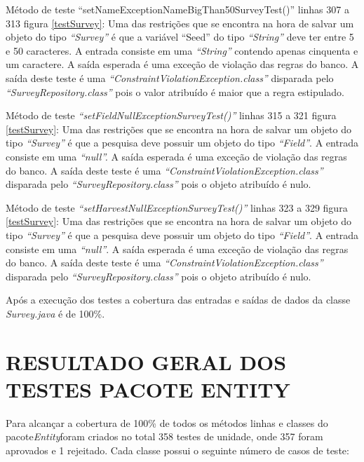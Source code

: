 Método de teste “setNameExceptionNameBigThan50SurveyTest()” linhas 307 a 313 figura \ref{testSurvey}: Uma das restrições que se encontra na hora de salvar um objeto do tipo \textit{“Survey”} é que a variável “Seed” do tipo \textit{“String”} deve ter entre 5 e 50 caracteres. A entrada consiste em uma \textit{“String”} contendo apenas cinquenta e um caractere. A saída esperada é uma exceção de violação das regras do banco. A saída deste teste é uma \textit{“ConstraintViolationException.class”} disparada pelo \textit{“SurveyRepository.class” }pois o valor atribuído é maior que a regra estipulado.

Método de teste \textit{“setFieldNullExceptionSurveyTest()”} linhas 315 a 321 figura \ref{testSurvey}: Uma das restrições que se encontra na hora de salvar um objeto do tipo \textit{“Survey”} é que a pesquisa deve possuir um objeto do tipo \textit{“Field”}. A entrada consiste em uma \textit{“null”.} A saída esperada é uma exceção de violação das regras do banco. A saída deste teste é uma \textit{“ConstraintViolationException.class”} disparada pelo \textit{“SurveyRepository.class”} pois o objeto atribuído é nulo.

Método de teste \textit{“setHarvestNullExceptionSurveyTest()”} linhas 323 a 329 figura \ref{testSurvey}: Uma das restrições que se encontra na hora de salvar um objeto do tipo \textit{“Survey”} é que a pesquisa deve possuir um objeto do tipo \textit{“Field”}. A entrada consiste em uma \textit{“null”}. A saída esperada é uma exceção de violação das regras do banco. A saída deste teste é uma\textit{ “ConstraintViolationException.class” }disparada pelo \textit{“SurveyRepository.class” }pois o objeto atribuído é nulo.



Após a execução dos testes a cobertura das entradas e saídas de dados da classe \textit{Survey.java} é de 100\%. 


\section{RESULTADO GERAL DOS TESTES PACOTE ENTITY}

Para alcançar a cobertura de 100\%  de todos os métodos linhas e classes do pacote\textit{Entity}foram criados no total 358 testes de unidade, onde 357 foram aprovados e 1 rejeitado. Cada classe possui o seguinte número de casos de teste: 

